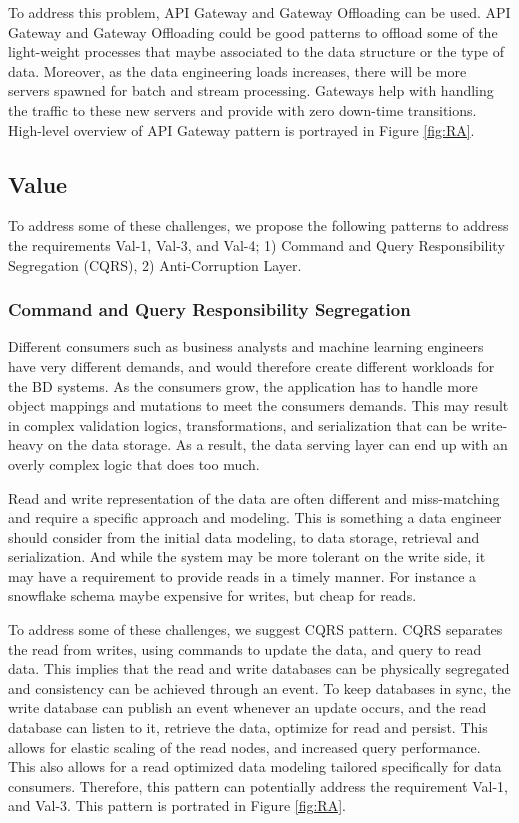 \documentclass[a4paper,11pt,article,oneside]{memoir}
\begin{document}
To address this problem, API Gateway and Gateway Offloading can be used. API Gateway and Gateway Offloading could be good patterns to offload some of the light-weight processes that maybe associated to the data structure or the type of data. Moreover, as the data engineering loads increases, there will be more servers spawned for batch and stream processing. Gateways help with handling the traffic to these new servers and provide with zero down-time transitions. High-level overview of API Gateway pattern is portrayed in Figure \ref{fig:RA}.

\subsection{Value}

To address some of these challenges, we propose the following patterns to address the requirements Val-1, Val-3, and Val-4; 1) Command and Query Responsibility Segregation (CQRS), 2) Anti-Corruption Layer.

\subsubsection{Command and Query Responsibility Segregation}

Different consumers such as business analysts and machine learning engineers have very different demands, and would therefore create different workloads for the BD systems. As the consumers grow, the application has to handle more object mappings and mutations to meet the consumers demands. This may result in complex validation logics, transformations, and serialization that can be write-heavy on the data storage. As a result, the data serving layer can end up with an overly complex logic that does too much. 

Read and write representation of the data are often different and miss-matching and require a specific approach and modeling. This is something a data engineer should consider from the initial data modeling, to data storage, retrieval and serialization. And while the system may be more tolerant on the write side, it may have a requirement to provide reads in a timely manner.  For instance a snowflake schema maybe expensive for writes, but cheap for reads. 

To address some of these challenges, we suggest CQRS pattern. CQRS separates the read from writes, using commands to update the data, and query to read data. This implies that the read and write databases can be physically segregated and consistency can be achieved through an event. To keep databases in sync, the write database can publish an event whenever an update occurs, and the read database can listen to it, retrieve the data, optimize for  read and persist. This allows for elastic scaling of the read nodes, and increased query performance. This also allows for a read optimized data modeling tailored specifically for data consumers. Therefore, this pattern can potentially address the requirement Val-1, and Val-3. This pattern is portrated in Figure \ref{fig:RA}.
\end{document}
